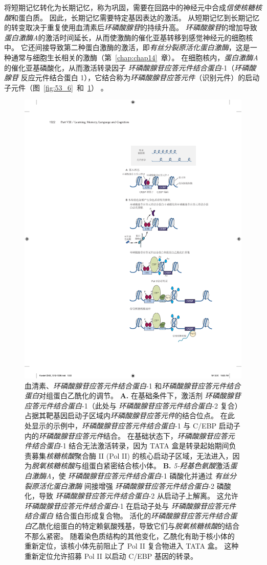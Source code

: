 将短期记忆转化为长期记忆，称为巩固，需要在回路中的神经元中合成\textit{信使核糖核酸}和蛋白质。
因此，长期记忆需要特定基因表达的激活。
从短期记忆到长期记忆的转变取决于重复使用血清素后\textit{环磷酸腺苷}的持续升高。
\textit{环磷酸腺苷}的增加导致\textit{蛋白激酶A}的激活时间延长，从而使激酶的催化亚基转移到感觉神经元的细胞核中。
它还间接导致第二种蛋白激酶的激活，即\textit{有丝分裂原活化蛋白激酶}，这是一种通常与细胞生长相关的激酶（第~\ref{chap:chap14}~章）。
在细胞核内，\textit{蛋白激酶A}的催化亚基磷酸化，从而激活转录因子 \textit{环磷酸腺苷应答元件结合蛋白}-1（\textit{环磷酸腺苷} 反应元件结合蛋白 1），它结合称为\textit{环磷酸腺苷应答元件}（识别元件）的启动子元件（图~\ref{fig:53_6}~和~\ref{fig:53_7}） 。


\begin{figure}[htbp]
	\centering
	\includegraphics[width=0.6\linewidth]{chap53/fig_53_7}
	\caption{血清素、\textit{环磷酸腺苷应答元件结合蛋白}-1 和\textit{环磷酸腺苷应答元件结合蛋白}对组蛋白乙酰化的调节。 
		\textbf{A.} 在基础条件下，激活剂 \textit{环磷酸腺苷应答元件结合蛋白}-1（此处与 \textit{环磷酸腺苷应答元件结合蛋白}-2 复合）占据其靶基因启动子区域内\textit{环磷酸腺苷应答元件}的结合位点。
		在此处显示的示例中，\textit{环磷酸腺苷应答元件结合蛋白}-1 与 C/EBP 启动子内的\textit{环磷酸腺苷应答元件}结合。
		在基础状态下，\textit{环磷酸腺苷应答元件结合蛋白}-1 结合无法激活转录，因为 TATA 盒是转录起始期间负责募集\textit{核糖核酸}聚合酶 II (Pol II) 的核心启动子区域，无法进入，因为\textit{脱氧核糖核酸}与组蛋白紧密结合核小体。
		\textbf{B.} \textit{5-羟基色氨酸}激活\textit{蛋白激酶A}，使 \textit{环磷酸腺苷应答元件结合蛋白}-1 磷酸化并通过 \textit{有丝分裂原活化蛋白激酶} 间接增强 \textit{环磷酸腺苷应答元件结合蛋白}-2 磷酸化，导致 \textit{环磷酸腺苷应答元件结合蛋白}-2 从启动子上解离。
		这允许 \textit{环磷酸腺苷应答元件结合蛋白}-1 在启动子处与 \textit{环磷酸腺苷应答元件结合蛋白} 结合蛋白形成复合物。
		活化的\textit{环磷酸腺苷应答元件结合蛋白}乙酰化组蛋白的特定赖氨酸残基，导致它们与\textit{脱氧核糖核酸}的结合不那么紧密。
		随着染色质结构的其他变化，乙酰化有助于核小体的重新定位，该核小体先前阻止了 Pol II 复合物进入 TATA 盒。
		这种重新定位允许招募 Pol II 以启动 C/EBP 基因的转录。}
	\label{fig:53_7}
\end{figure}


